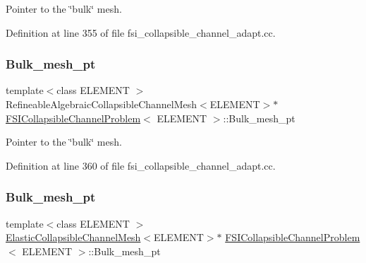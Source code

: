 Pointer to the \char`\"{}bulk\char`\"{} mesh. 



Definition at line 355 of file fsi\+\_\+collapsible\+\_\+channel\+\_\+adapt.\+cc.

\mbox{\label{classFSICollapsibleChannelProblem_aa0da71e3534daa79c0c4c2e6dbc6338c}} 
\subsubsection{\texorpdfstring{Bulk\+\_\+mesh\+\_\+pt}{Bulk\_mesh\_pt}\hspace{0.1cm}{\footnotesize\ttfamily [4/6]}}
{\footnotesize\ttfamily template$<$class E\+L\+E\+M\+E\+NT $>$ \\
Refineable\+Algebraic\+Collapsible\+Channel\+Mesh$<$E\+L\+E\+M\+E\+NT$>$$\ast$ \hyperlink{classFSICollapsibleChannelProblem}{F\+S\+I\+Collapsible\+Channel\+Problem}$<$ E\+L\+E\+M\+E\+NT $>$\+::Bulk\+\_\+mesh\+\_\+pt\hspace{0.3cm}{\ttfamily [private]}}



Pointer to the \char`\"{}bulk\char`\"{} mesh. 



Definition at line 360 of file fsi\+\_\+collapsible\+\_\+channel\+\_\+adapt.\+cc.

\mbox{\label{classFSICollapsibleChannelProblem_a73b35b23f07b5f79e288064c2e62e1ac}} 
\subsubsection{\texorpdfstring{Bulk\+\_\+mesh\+\_\+pt}{Bulk\_mesh\_pt}\hspace{0.1cm}{\footnotesize\ttfamily [5/6]}}
{\footnotesize\ttfamily template$<$class E\+L\+E\+M\+E\+NT $>$ \\
\hyperlink{classElasticCollapsibleChannelMesh}{Elastic\+Collapsible\+Channel\+Mesh}$<$E\+L\+E\+M\+E\+NT$>$$\ast$ \hyperlink{classFSICollapsibleChannelProblem}{F\+S\+I\+Collapsible\+Channel\+Problem}$<$ E\+L\+E\+M\+E\+NT $>$\+::Bulk\+\_\+mesh\+\_\+pt\hspace{0.3cm}{\ttfamily [private]}}



